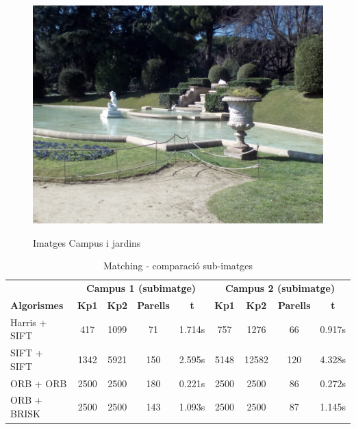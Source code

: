 \begin{figure}[!htb]
				\label{fig:awesome_image3}
			\endminipage\hfill
				\includegraphics[width=\linewidth]{images/experiments/jardi2}
				\label{fig:awesome_image3}
			\endminipage
			\caption{Imatges Campus i jardins}
		\end{figure}

		\begin{table}[H]
			\begin{center}
				\begin{tabular}{l | c c c c | c c c c}
					& \multicolumn{4}{c|}{\textbf{Campus 1 (subimatge)}} & \multicolumn{4}{c}{\textbf{Campus 2 (subimatge)}} \\
					\textbf{Algorismes} & \textbf{Kp1} & \textbf{Kp2} & \textbf{Parells} & \textbf{t} & \textbf{Kp1} & \textbf{Kp2} & \textbf{Parells} & \textbf{t} \\ \hline
					Harris + SIFT & 417 & 1099 & 71 & 1.714s & 757 & 1276 & 66 & 0.917s \\
					SIFT + SIFT & 1342 & 5921 & 150 & 2.595s & 5148 & 12582 & 120 & 4.328s \\
					ORB + ORB & 2500 & 2500 & 180 & 0.221s & 2500 & 2500 & 86 & 0.272s \\
					ORB + BRISK & 2500 & 2500 & 143 & 1.093s & 2500 & 2500 & 87 & 1.145s \\
				\end{tabular}
			\end{center}
			\caption{Matching - comparació sub-imatges}
		\end{table}

